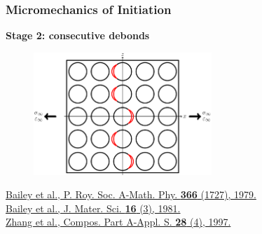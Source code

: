 \documentclass[first,firstsupp,lastsupp,last,hyperref,table]{ETHclass}
\begin{document}
\begin{frame}
\frametitle{\vspace{0.2cm}\small Micromechanics of Initiation}
\vspace{-0.5cm}
\centering
\begin{alertblock}{\centering\scriptsize\bf Stage 2: consecutive debonds}
\vspace{-0.25cm}
\begin{figure}
\centering
\includegraphics[width=0.6\textwidth]{stage2-critdebonds.pdf}
\end{figure}
\end{alertblock}
\vspace{-0.5cm}
\pgfmathsetmacro{}
\pgfmathsetmacro{}
{\fontsize{\fontsizeref}{\stretchref} \selectfont \href{https://doi.org/10.1098/rspa.1979.0071}{Bailey et al., P. Roy. Soc. A-Math. Phy. \textbf{366} (1727), 1979.}}\\\vspace{-5pt}
{\fontsize{\fontsizeref}{\stretchref} \selectfont \href{https://doi.org/10.1007/BF00552203}{Bailey et al., J. Mater. Sci. \textbf{16} (3), 1981.}}\\\vspace{-5pt}
{\fontsize{\fontsizeref}{\stretchref} \selectfont \href{https://doi.org/10.1016/S1359-835X(96)00123-6}{Zhang et al., Compos. Part A-Appl. S. \textbf{28} (4), 1997.}}
\end{frame}

\addtocounter{framenumber}{-1}
\end{document}
